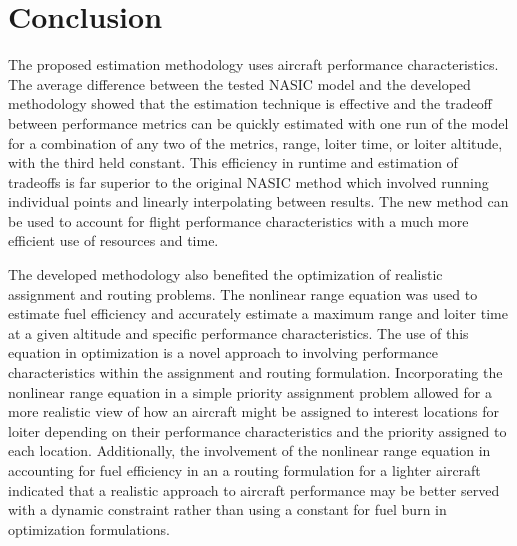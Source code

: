 \section{Conclusion}
The proposed estimation methodology uses aircraft performance characteristics. The average difference between the tested NASIC model and the developed methodology showed that the estimation technique is effective and the tradeoff between performance metrics can be quickly estimated with one run of the model for a combination of any two of the metrics, range, loiter time, or loiter altitude, with the third held constant. This efficiency in runtime and estimation of tradeoffs is far superior to the original NASIC method which involved running individual points and linearly interpolating between results. The new method can be used to account for flight performance characteristics with a much more efficient use of resources and time.\par
The developed methodology also benefited the optimization of realistic assignment and routing problems. The nonlinear range equation was used to estimate fuel efficiency and accurately estimate a maximum range and loiter time at a given altitude and specific performance characteristics. The use of this equation in optimization is a novel approach to involving performance characteristics within the assignment and routing formulation. Incorporating the nonlinear range equation in a simple priority assignment problem allowed for a more realistic view of how an aircraft might be assigned to interest locations for loiter depending on their performance characteristics and the priority assigned to each location. Additionally, the involvement of the nonlinear range equation in accounting for fuel efficiency in an a routing formulation for a lighter aircraft indicated that a realistic approach to aircraft performance may be better served with a dynamic constraint rather than using a constant for fuel burn in optimization formulations.
